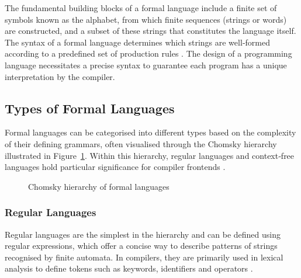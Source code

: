 The fundamental building blocks of a formal language include a finite set of symbols known as the alphabet, from which finite sequences (strings or words) are constructed, and a subset of these strings that constitutes the language itself. The syntax of a formal language determines which strings are well‑formed according to a predefined set of production rules \cite{aho2007compilers, runestone-formal-natural-languages}. The design of a programming language necessitates a precise syntax to guarantee each program has a unique interpretation by the compiler.

\subsection{Types of Formal Languages}

Formal languages can be categorised into different types based on the complexity of their defining grammars, often visualised through the Chomsky hierarchy illustrated in Figure~\ref{figure:chomsky}. Within this hierarchy, regular languages and context‑free languages hold particular significance for compiler frontends \cite{aho2007compilers}.

\begin{figure}[ht]
\centering
{}
\caption{Chomsky hierarchy of formal languages}
\label{figure:chomsky}
\end{figure}

\subsubsection*{Regular Languages}
Regular languages are the simplest in the hierarchy and can be defined using regular expressions, which offer a concise way to describe patterns of strings recognised by finite automata. In compilers, they are primarily used in lexical analysis to define tokens such as keywords, identifiers and operators \cite{aho2007compilers}.

